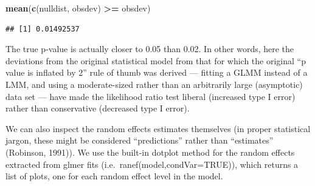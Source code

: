 \documentclass[
  12pt,
]{book}
\newenvironment{Shaded}{\begin{snugshade}}{\end{snugshade}}
\newcommand{\KeywordTok}[1]{\textcolor[rgb]{0.13,0.29,0.53}{\textbf{#1}}}
\newcommand{\NormalTok}[1]{#1}
\newcommand{\OperatorTok}[1]{\textcolor[rgb]{0.81,0.36,0.00}{\textbf{#1}}}
\newcommand{\StringTok}[1]{\textcolor[rgb]{0.31,0.60,0.02}{#1}}
\begin{document}
\begin{Shaded}
\begin{Highlighting}[]
\KeywordTok{mean}\NormalTok{(}\KeywordTok{c}\NormalTok{(nulldist, obsdev) }\OperatorTok{\textgreater{}=}\StringTok{ }\NormalTok{obsdev)}
\end{Highlighting}
\end{Shaded}

\begin{verbatim}
## [1] 0.01492537
\end{verbatim}

The true p-value is actually closer to 0.05 than 0.02. In other words, here the deviations from the original statistical model from that for which the original ``p value is inflated by 2'' rule of thumb was derived --- fitting a GLMM instead of a LMM, and using a moderate-sized rather than an arbitrarily large (asymptotic) data set --- have made the likelihood ratio test liberal (increased type I error) rather than conservative (decreased type I error).

We can also inspect the random effects estimates themselves (in proper statistical jargon, these might be considered ``predictions'' rather than ``estimates'' (Robinson, 1991)). We use the built-in dotplot method for the random effects extracted from glmer fits (i.e.~ranef(model,condVar=TRUE)), which returns a list of plots, one for each random effect level in the model.
\end{document}
